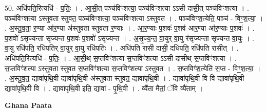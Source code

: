 \documentclass[17pt]{extarticle}
\begin{document}
50. अधि॑पति॒रित्यधि॑ - प॒तिः॒ । . आ॒सी॒त् पञ्च॑विꣳशत्या॒ पञ्च॑विꣳशत्या ऽऽसी दासी॒त् पञ्च॑विꣳशत्या । . पञ्च॑विꣳशत्या ऽस्तुवता स्तुवत॒ पञ्च॑विꣳशत्या॒ पञ्च॑विꣳशत्या ऽस्तुवत । . पञ्च॑विꣳश॒त्येति॒ पञ्च॑ - विꣳ॒॒श॒त्या॒ । . अ॒स्तु॒व॒ता॒ र॒ण्या आ॑र॒ण्या अ॑स्तुवता स्तुवता र॒ण्याः । . आ॒र॒ण्याः प॒शवः॑ प॒शव॑ आर॒ण्या आ॑र॒ण्याः प॒शवः॑ । . प॒शवो॑ ऽसृज्यन्ता सृज्यन्त प॒शवः॑ प॒शवो॑ ऽसृज्यन्त । . अ॒सृ॒ज्य॒न्त॒ वा॒युर् वा॒यु र॑सृज्यन्ता सृज्यन्त वा॒युः । . वा॒यु रधि॑पति॒ रधि॑पतिर् वा॒युर् वा॒यु रधि॑पतिः । . अधि॑पति रासी दासी॒ दधि॑पति॒ रधि॑पति रासीत् । . अधि॑पति॒रित्यधि॑ - प॒तिः॒ । . आ॒सी॒थ् स॒प्तविꣳ॑शत्या स॒प्तविꣳ॑शत्या ऽऽसी दासीथ् स॒प्तविꣳ॑शत्या । . स॒प्तविꣳ॑शत्या ऽस्तुवता स्तुवत स॒प्तविꣳ॑शत्या स॒प्तविꣳ॑शत्या ऽस्तुवत । . स॒प्तविꣳ॑श॒त्येति॑ स॒प्त - विꣳ॒॒श॒त्या॒ । . अ॒स्तु॒व॒त॒ द्यावा॑पृथि॒वी द्यावा॑पृथि॒वी अ॑स्तुवता स्तुवत॒ द्यावा॑पृथि॒वी । . द्यावा॑पृथि॒वी वि वि द्यावा॑पृथि॒वी द्यावा॑पृथि॒वी वि । . द्यावा॑पृथि॒वी इति॒ द्यावा᳚ - पृ॒थि॒वी । . व्यै॑ता मैतां॒ ॅवि व्यै॑ताम् । \newline

\textbf{Ghana Paata } \newline
\end{document}
